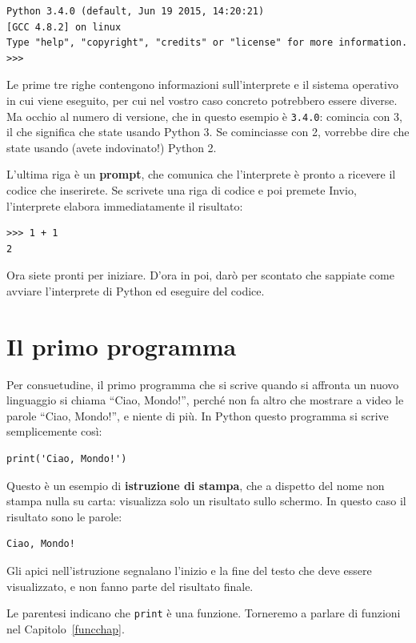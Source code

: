 \documentclass[10pt]{book}
\begin{document}
\begin{verbatim}
Python 3.4.0 (default, Jun 19 2015, 14:20:21)
[GCC 4.8.2] on linux
Type "help", "copyright", "credits" or "license" for more information.
>>>
\end{verbatim}
%
Le prime tre righe contengono informazioni sull'interprete e il sistema operativo in cui viene eseguito, per cui nel vostro caso concreto potrebbero essere diverse. Ma occhio al numero di versione, che in questo esempio è 
{\tt 3.4.0}: comincia con 3, il che significa che state usando Python 3. Se cominciasse con 2, vorrebbe dire che state usando (avete indovinato!) Python 2.

L'ultima riga è un {\bf prompt}, che comunica che l'interprete è pronto a ricevere il codice che inserirete. Se scrivete una riga di codice e poi premete Invio, l'interprete elabora immediatamente il risultato:

\begin{verbatim}
>>> 1 + 1
2
\end{verbatim}
%
Ora siete pronti per iniziare. D'ora in poi, darò per scontato che sappiate come avviare l'interprete di Python ed eseguire del codice.

\section{Il primo programma}
\label{hello}

Per consuetudine, il primo programma che si scrive quando si affronta un nuovo linguaggio si chiama ``Ciao, Mondo!'', perché non fa altro che mostrare a video le parole ``Ciao, Mondo!'', e niente di più. In Python questo programma si scrive semplicemente così:

\begin{verbatim}
print('Ciao, Mondo!')
\end{verbatim}
%
Questo è un esempio di {\bf istruzione di stampa}, che a dispetto del nome non stampa nulla su carta: visualizza solo un risultato sullo schermo. In questo caso il risultato sono le parole:

\begin{verbatim}
Ciao, Mondo!
\end{verbatim}
%
Gli apici nell'istruzione segnalano l'inizio e la fine del testo che deve essere visualizzato, e non fanno parte del risultato finale.

Le parentesi indicano che {\tt print} è una funzione. Torneremo a parlare di funzioni nel Capitolo~\ref{funcchap}.
\end{document}
